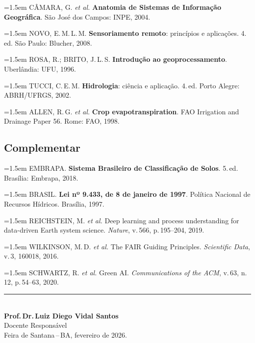 \documentclass[11pt,a4paper]{article}
\begin{document}
\begin{small}
\hangindent=1.5em
CÂMARA, G. \textit{et al.} \textbf{Anatomia de Sistemas de Informação Geográfica}. São José dos Campos: INPE, 2004.\par\medskip

\hangindent=1.5em
NOVO, E.\,M.\,L.\,M. \textbf{Sensoriamento remoto}: princípios e aplicações. 4.\,ed. São Paulo: Blucher, 2008.\par\medskip

\hangindent=1.5em
ROSA, R.; BRITO, J.\,L.\,S. \textbf{Introdução ao geoprocessamento}. Uberlândia: UFU, 1996.\par\medskip

\hangindent=1.5em
TUCCI, C.\,E.\,M. \textbf{Hidrologia}: ciência e aplicação. 4.\,ed. Porto Alegre: ABRH/UFRGS, 2002.\par\medskip

\hangindent=1.5em
ALLEN, R.\,G. \textit{et al.} \textbf{Crop evapotranspiration}. FAO Irrigation and Drainage Paper 56. Rome: FAO, 1998.\par\medskip
\end{small}

\subsection*{Complementar}

\begin{small}
\hangindent=1.5em
EMBRAPA. \textbf{Sistema Brasileiro de Classificação de Solos}. 5.\,ed. Brasília: Embrapa, 2018.\par\medskip

\hangindent=1.5em
BRASIL. \textbf{Lei nº 9.433, de 8 de janeiro de 1997}. Política Nacional de Recursos Hídricos. Brasília, 1997.\par\medskip

\hangindent=1.5em
REICHSTEIN, M. \textit{et al.} Deep learning and process understanding for data-driven Earth system science. \textit{Nature}, v.\,566, p.\,195--204, 2019.\par\medskip

\hangindent=1.5em
WILKINSON, M.\,D. \textit{et al.} The FAIR Guiding Principles. \textit{Scientific Data}, v.\,3, 160018, 2016.\par\medskip

\hangindent=1.5em
SCHWARTZ, R. \textit{et al.} Green AI. \textit{Communications of the ACM}, v.\,63, n.\,12, p.\,54--63, 2020.\par\medskip
\end{small}



\vfill

\begin{center}
\noindent\rule{6cm}{0.4pt}\\[6pt]
\textbf{Prof.\,Dr.\,Luiz Diego Vidal Santos}\\
Docente Responsável\\[4pt]
{\small Feira de Santana\,--\,BA, fevereiro de 2026.}
\end{center}
\end{document}
